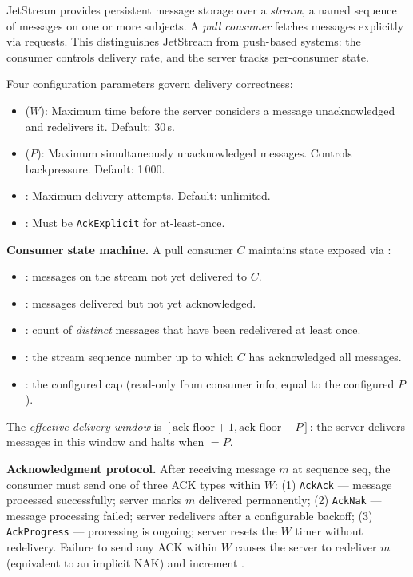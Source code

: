 \documentclass[journal]{IEEEtran}
\begin{document}
JetStream provides persistent message storage over a \emph{stream},
a named sequence of messages on one or more subjects. A \emph{pull consumer}
fetches messages explicitly via  requests.
This distinguishes JetStream from push-based systems: the consumer controls
delivery rate, and the server tracks per-consumer state.

Four configuration parameters govern delivery correctness:
\begin{itemize}
\item {} ($W$): Maximum time before the server considers a
  message unacknowledged and redelivers it. Default: 30\,s.
\item {} ($P$): Maximum simultaneously unacknowledged
  messages. Controls backpressure. Default: 1\,000.
\item {}: Maximum delivery attempts. Default: unlimited.
\item {}: Must be \texttt{AckExplicit} for at-least-once.
\end{itemize}

\textbf{Consumer state machine.} A pull consumer $C$ maintains state
exposed via :
\begin{itemize}
\item {}: messages on the stream not yet delivered to $C$.
\item {}: messages delivered but not yet acknowledged.
\item {}: count of \emph{distinct} messages that have
  been redelivered at least once.
\item {}: the stream sequence number up to which
  $C$ has acknowledged all messages.
\item {}: the configured cap (read-only from consumer
  info; equal to the configured $P$).
\end{itemize}

The \emph{effective delivery window} is $[\text{ack\_floor} + 1,
\text{ack\_floor} + P]$: the server delivers messages in this window
and halts when  $= P$.

\textbf{Acknowledgment protocol.} After receiving message $m$ at sequence
$\text{seq}$, the consumer must send one of three ACK types within $W$:
(1) \texttt{AckAck} --- message processed successfully; server marks $m$
delivered permanently; (2) \texttt{AckNak} --- message processing failed;
server redelivers after a configurable backoff; (3) \texttt{AckProgress}
--- processing is ongoing; server resets the $W$ timer without redelivery.
Failure to send any ACK within $W$ causes the server to redeliver $m$
(equivalent to an implicit NAK) and increment .
\end{document}
